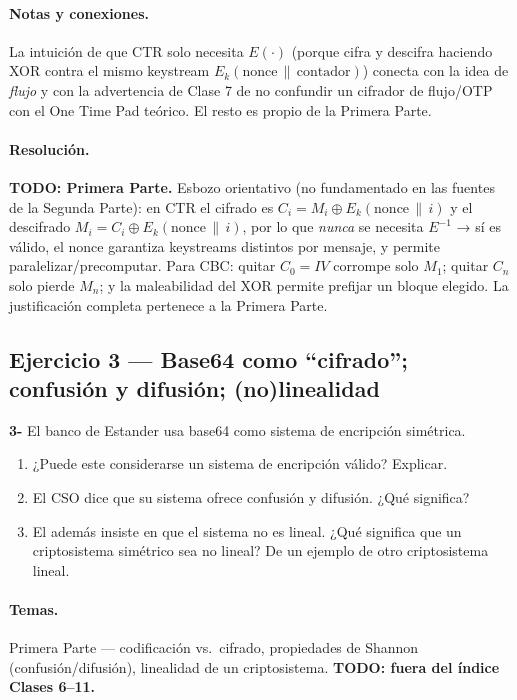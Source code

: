 \paragraph{Notas y conexiones.}
La intuición de que CTR solo necesita $E(\cdot)$ (porque cifra y descifra haciendo XOR contra el
mismo keystream $E_k(\text{nonce}\,\|\,\text{contador})$) conecta con la idea de \emph{flujo} y
con la advertencia de Clase 7 de no confundir un cifrador de flujo/OTP con el One Time Pad teórico.
El resto es propio de la Primera Parte.

\paragraph{Resolución.}
\textbf{TODO: Primera Parte.} Esbozo orientativo (no fundamentado en las fuentes de la Segunda
Parte): en CTR el cifrado es $C_i = M_i \oplus E_k(\text{nonce}\,\|\,i)$ y el descifrado
$M_i = C_i \oplus E_k(\text{nonce}\,\|\,i)$, por lo que \emph{nunca} se necesita $E^{-1}$ → sí es
válido, el nonce garantiza keystreams distintos por mensaje, y permite paralelizar/precomputar.
Para CBC: quitar $C_0=IV$ corrompe solo $M_1$; quitar $C_n$ solo pierde $M_n$; y la maleabilidad
del XOR permite prefijar un bloque elegido. La justificación completa pertenece a la Primera Parte.

\subsection{Ejercicio 3 — Base64 como ``cifrado''; confusión y difusión; (no)linealidad}

\begin{consigna}
\textbf{3-} El banco de Estander usa base64 como sistema de encripción simétrica.
\begin{enumerate}
\item[a)] ¿Puede este considerarse un sistema de encripción válido? Explicar.
\item[b)] El CSO dice que su sistema ofrece confusión y difusión. ¿Qué significa?
\item[c)] El además insiste en que el sistema no es lineal. ¿Qué significa que un criptosistema simétrico sea no lineal? De un ejemplo de otro criptosistema lineal.
\end{enumerate}
\end{consigna}

\paragraph{Temas.}
Primera Parte — codificación vs.\ cifrado, propiedades de Shannon (confusión/difusión), linealidad
de un criptosistema. \textbf{TODO: fuera del índice Clases 6--11.}

